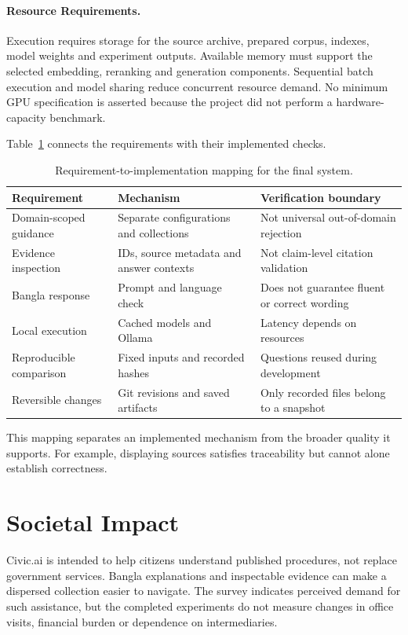 \paragraph{Resource Requirements.}
Execution requires storage for the source archive, prepared corpus, indexes, model weights and experiment outputs. Available memory must support the selected embedding, reranking and generation components. Sequential batch execution and model sharing reduce concurrent resource demand. No minimum GPU specification is asserted because the project did not perform a hardware-capacity benchmark.

Table~\ref{tab:requirements} connects the requirements with their implemented checks.
\begin{table}[htbp]\centering\small
\caption{Requirement-to-implementation mapping for the final system.}\label{tab:requirements}
\begin{tabularx}{\linewidth}{p{32mm}XX}\toprule
Requirement & Mechanism & Verification boundary\\\midrule
Domain-scoped guidance & Separate configurations and collections & Not universal out-of-domain rejection\\
Evidence inspection & IDs, source metadata and answer contexts & Not claim-level citation validation\\
Bangla response & Prompt and language check & Does not guarantee fluent or correct wording\\
Local execution & Cached models and Ollama & Latency depends on resources\\
Reproducible comparison & Fixed inputs and recorded hashes & Questions reused during development\\
Reversible changes & Git revisions and saved artifacts & Only recorded files belong to a snapshot\\\bottomrule
\end{tabularx}\end{table}
This mapping separates an implemented mechanism from the broader quality it supports. For example, displaying sources satisfies traceability but cannot alone establish correctness.

\section{Societal Impact}
Civic.ai is intended to help citizens understand published procedures, not replace government services. Bangla explanations and inspectable evidence can make a dispersed collection easier to navigate. The survey indicates perceived demand for such assistance, but the completed experiments do not measure changes in office visits, financial burden or dependence on intermediaries.

